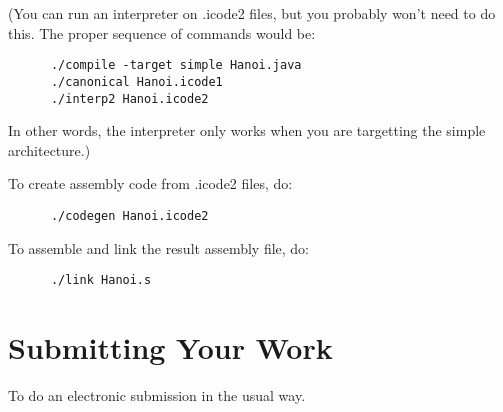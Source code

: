\documentclass[11pt]{article}
\begin{document}
(You can run an interpreter on .icode2 files, but you probably won't need to do this.  The proper sequence of commands would be:
\begin{verbatim}
      ./compile -target simple Hanoi.java
      ./canonical Hanoi.icode1
      ./interp2 Hanoi.icode2
\end{verbatim}
In other words, the interpreter only works when you are targetting the simple architecture.)

To create assembly code from .icode2 files, do:
\begin{verbatim}
      ./codegen Hanoi.icode2
\end{verbatim}

To assemble and link the result assembly file, do:
\begin{verbatim}
      ./link Hanoi.s
\end{verbatim}

\section{Submitting Your Work}
To do an electronic submission in the usual way.
\end{document}
